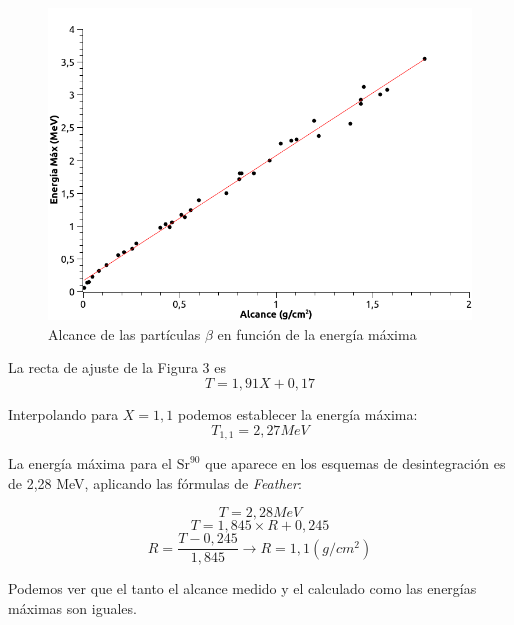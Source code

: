 \documentclass[a4paper,12pt,spanish]{article}
\begin{document}
	\begin{figure}[H]
		\centering
		\includegraphics[width=0.7\linewidth]{imagenes/nueva_copiar}
		\caption{Alcance de las partículas $\beta$ en función de la energía máxima}
		\label{fig:graficaenergiabuena}
	\end{figure}
	
	
	La recta de ajuste de la Figura 3 es
	\[ T = 1,91 X + 0,17
	\]
	
	Interpolando para $X = 1,1$ podemos establecer la energía máxima:
	\[ T_{1,1} = 2,27 \si{MeV}
	\]
	
	
	La energía máxima para el $\text{Sr}^{90}$ que aparece en los esquemas de desintegración es de 2,28 MeV, aplicando las fórmulas de \textit{Feather}:
	
	\[T= 2,28 \si{MeV}\]
	\[T = 1,845\times R + 0,245\]
	\[R = \frac{T - 0,245}{1,845} \longrightarrow R = 1,1 (\si{g/cm^2})\]
	
	Podemos ver que el tanto el alcance medido y el calculado como las energías máximas son iguales.
	
	

	
	
	
	
	
\end{document}
